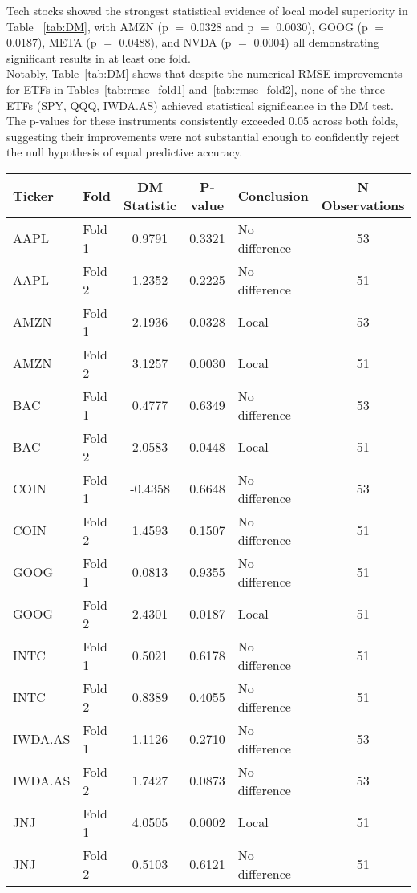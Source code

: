 \documentclass[12pt]{report}
\begin{document}
Tech stocks showed the strongest statistical evidence of local model superiority in Table ~\ref{tab:DM}, with AMZN (p \(=\) 0.0328 and p \(=\) 0.0030), GOOG (p \(=\) 0.0187), META (p \(=\) 0.0488), and NVDA (p \(=\) 0.0004) all demonstrating significant results in at least one fold.\\

Notably, Table~\ref{tab:DM} shows that despite the numerical RMSE improvements for ETFs in Tables~\ref{tab:rmse_fold1} and~\ref{tab:rmse_fold2}, none of the three ETFs (SPY, QQQ, IWDA.AS) achieved statistical significance in the DM test. The p-values for these instruments consistently exceeded 0.05 across both folds, suggesting their improvements were not substantial enough to confidently reject the null hypothesis of equal predictive accuracy.

\begin{table}[H]
\centering
\begin{tabular}{|l|l|c|c|l|c|}
\hline
\textbf{Ticker} & \textbf{Fold} & \textbf{DM Statistic} & \textbf{P-value} & \textbf{Conclusion} & \textbf{N Observations} \\
\hline
AAPL & Fold 1 & 0.9791 & 0.3321 & No difference & 53 \\
AAPL & Fold 2 & 1.2352 & 0.2225 & No difference & 51 \\
AMZN & Fold 1 & 2.1936 & 0.0328 & Local  & 53 \\
AMZN & Fold 2 & 3.1257 & 0.0030 & Local  & 51 \\
BAC & Fold 1 & 0.4777 & 0.6349 & No difference & 53 \\
BAC & Fold 2 & 2.0583 & 0.0448 & Local  & 51 \\
COIN & Fold 1 & -0.4358 & 0.6648 & No difference & 53 \\
COIN & Fold 2 & 1.4593 & 0.1507 & No difference & 51 \\
GOOG & Fold 1 & 0.0813 & 0.9355 & No difference & 51 \\
GOOG & Fold 2 & 2.4301 & 0.0187 & Local  & 51 \\
INTC & Fold 1 & 0.5021 & 0.6178 & No difference & 51 \\
INTC & Fold 2 & 0.8389 & 0.4055 & No difference & 51 \\
IWDA.AS & Fold 1 & 1.1126 & 0.2710 & No difference & 53 \\
IWDA.AS & Fold 2 & 1.7427 & 0.0873 & No difference & 53 \\
JNJ & Fold 1 & 4.0505 & 0.0002 & Local  & 51 \\
JNJ & Fold 2 & 0.5103 & 0.6121 & No difference & 51 \\

\end{tabular}
\end{table}
\end{document}

